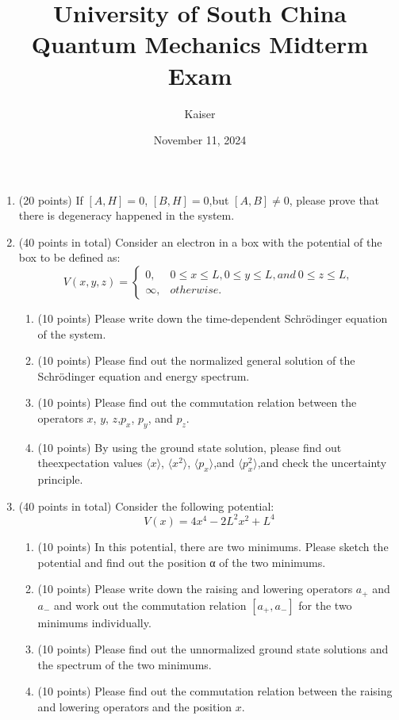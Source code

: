 \documentclass{article}
\title{University of South China Quantum Mechanics
Midterm Exam}
\author{Kaiser}
\date{November 11, 2024}
\begin{document}
\maketitle


\begin{enumerate}
    \item (20 points) If $[A, H] = 0$, $[B, H] = 0$,but $[A, B] \neq 0$, please prove that
    there is degeneracy happened in the system.
    \item (40 points in total) Consider an electron in a box with the potential of the
    box to be defined as:
    $$
        V (x, y, z) =
        \begin{cases}
            0,& 0 \leq  x \leq  L, 0 \leq  y \leq  L, and\ 0 \leq  z \leq  L,\\
            \infty ,&otherwise.
        \end{cases}
    $$
    \begin{enumerate}
        \item (10 points) Please write down the time-dependent Schrödinger equation of the system.
        \item (10 points) Please find out the normalized general solution of the Schrödinger equation and energy spectrum.
        \item (10 points) Please find out the commutation relation between the operators $x$, $y$, $z$,$ p_x$, $p_y$, and $p_z.$
        \item (10 points) By using the ground state solution, please find out theexpectation values $\langle x\rangle$, $\langle x^2\rangle$, $\langle p_x\rangle$,and $\langle p^2_x\rangle$,and check the uncertainty principle.
    \end{enumerate}
    \item (40 points in total) Consider the following potential:
        \[V (x) = 4x^4 − 2L^2x^2 + L^4\]
        \begin{enumerate}
            \item (10 points) In this potential, there are two minimums. Please sketch the potential and find out the position α of the two minimums.
            \item (10 points) Please write down the raising and lowering operators $a_+$ and $a_−$ and work out the commutation relation $[a_+, a_−]$ for the two minimums individually.
            \item (10 points) Please find out the unnormalized ground state solutions and the spectrum of the two minimums.
            \item (10 points) Please find out the commutation relation between the raising and lowering operators and the position $x$.
        \end{enumerate}


\end{enumerate}
\end{document}
